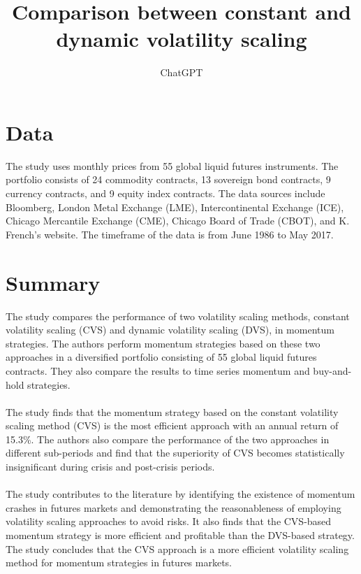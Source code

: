 \documentclass{article}
\title{Comparison between constant and dynamic volatility scaling}
\author{ChatGPT}
\begin{document}
 

\maketitle
\section{Data}
The study uses monthly prices from 55 global liquid futures instruments. The portfolio consists of 24 commodity contracts, 13 sovereign bond contracts, 9 currency contracts, and 9 equity index contracts. The data sources include Bloomberg, London Metal Exchange (LME), Intercontinental Exchange (ICE), Chicago Mercantile Exchange (CME), Chicago Board of Trade (CBOT), and K. French's website. The timeframe of the data is from June 1986 to May 2017. 
\section{Summary}
The study compares the performance of two volatility scaling methods, constant volatility scaling (CVS) and dynamic volatility scaling (DVS), in momentum strategies. The authors perform momentum strategies based on these two approaches in a diversified portfolio consisting of 55 global liquid futures contracts. They also compare the results to time series momentum and buy-and-hold strategies.  \\
\\
The study finds that the momentum strategy based on the constant volatility scaling method (CVS) is the most efficient approach with an annual return of 15.3\%. The authors also compare the performance of the two approaches in different sub-periods and find that the superiority of CVS becomes statistically insignificant during crisis and post-crisis periods.  \\
\\
The study contributes to the literature by identifying the existence of momentum crashes in futures markets and demonstrating the reasonableness of employing volatility scaling approaches to avoid risks. It also finds that the CVS-based momentum strategy is more efficient and profitable than the DVS-based strategy. The study concludes that the CVS approach is a more efficient volatility scaling method for momentum strategies in futures markets. 
\end{document}
